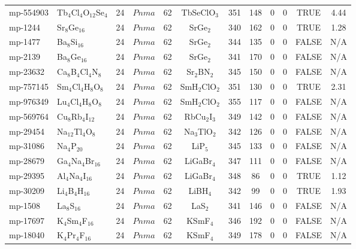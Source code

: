 {\begin{longtable}{llcccccccccc}
    mp-554903 & Tb$_{4}$Cl$_{4}$O$_{12}$Se$_{4}$ & 24    & $Pnma$ & 62    & TbSeClO$_{3}$ & 351   & 148   & 0     & 0     & TRUE  & 4.44  \\
    mp-1244 & Sr$_{8}$Ge$_{16}$ & 24    & $Pnma$ & 62    & SrGe$_{2}$ & 340   & 162   & 0     & 0     & TRUE  & 1.28  \\
    mp-1477 & Ba$_{8}$Si$_{16}$ & 24    & $Pnma$ & 62    & SrGe$_{2}$ & 344   & 135   & 0     & 0     & FALSE & N/A \\
    mp-2139 & Ba$_{8}$Ge$_{16}$ & 24    & $Pnma$ & 62    & SrGe$_{2}$ & 341   & 170   & 0     & 0     & FALSE & N/A \\
    mp-23632 & Ca$_{8}$B$_{4}$Cl$_{4}$N$_{8}$ & 24    & $Pnma$ & 62    & Sr$_{2}$BN$_{2}$ & 345   & 150   & 0     & 0     & FALSE & N/A \\
    mp-757145 & Sm$_{4}$Cl$_{4}$H$_{8}$O$_{8}$ & 24    & $Pnma$ & 62    & SmH$_{2}$ClO$_{2}$ & 351   & 130   & 0     & 0     & TRUE  & 2.31  \\
    mp-976349 & Lu$_{4}$Cl$_{4}$H$_{8}$O$_{8}$ & 24    & $Pnma$ & 62    & SmH$_{2}$ClO$_{2}$ & 355   & 117   & 0     & 0     & FALSE & N/A \\
    mp-569764 & Cu$_{8}$Rb$_{4}$I$_{12}$ & 24    & $Pnma$ & 62    & RbCu$_{2}$I$_{3}$ & 349   & 142   & 0     & 0     & FALSE & N/A \\
    mp-29454 & Na$_{12}$Tl$_{4}$O$_{8}$ & 24    & $Pnma$ & 62    & Na$_{3}$TlO$_{2}$ & 342   & 126   & 0     & 0     & FALSE & N/A \\
    mp-31086 & Na$_{4}$P$_{20}$ & 24    & $Pnma$ & 62    & LiP$_{5}$ & 345   & 133   & 0     & 0     & FALSE & N/A \\
    mp-28679 & Ga$_{4}$Na$_{4}$Br$_{16}$ & 24    & $Pnma$ & 62    & LiGaBr$_{4}$ & 347   & 111   & 0     & 0     & FALSE & N/A \\
    mp-29395 & Al$_{4}$Na$_{4}$I$_{16}$ & 24    & $Pnma$ & 62    & LiGaBr$_{4}$ & 348   & 86    & 0     & 0     & TRUE  & 1.12  \\
    mp-30209 & Li$_{4}$B$_{4}$H$_{16}$ & 24    & $Pnma$ & 62    & LiBH$_{4}$ & 342   & 99    & 0     & 0     & TRUE  & 1.93  \\
    mp-1508 & La$_{8}$S$_{16}$ & 24    & $Pnma$ & 62    & LaS$_{2}$ & 341   & 146   & 0     & 0     & FALSE & N/A \\
    mp-17697 & K$_{4}$Sm$_{4}$F$_{16}$ & 24    & $Pnma$ & 62    & KSmF$_{4}$ & 346   & 192   & 0     & 0     & FALSE & N/A \\
    mp-18040 & K$_{4}$Pr$_{4}$F$_{16}$ & 24    & $Pnma$ & 62    & KSmF$_{4}$ & 349   & 178   & 0     & 0     & FALSE & N/A \\

\end{longtable}}
